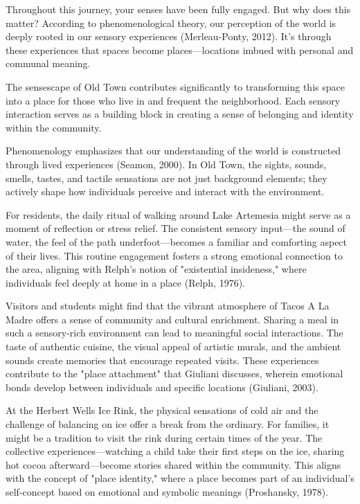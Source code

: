 \documentclass[12pt]{article}
\begin{document}
Throughout this journey, your senses have been fully engaged. But why does this matter? According to phenomenological theory, our perception of the world is deeply rooted in our sensory experiences (Merleau-Ponty, 2012). It's through these experiences that spaces become places—locations imbued with personal and communal meaning.

The sensescape of Old Town contributes significantly to transforming this space into a place for those who live in and frequent the neighborhood. Each sensory interaction serves as a building block in creating a sense of belonging and identity within the community.

Phenomenology emphasizes that our understanding of the world is constructed through lived experiences (Seamon, 2000). In Old Town, the sights, sounds, smells, tastes, and tactile sensations are not just background elements; they actively shape how individuals perceive and interact with the environment.

For residents, the daily ritual of walking around Lake Artemesia might serve as a moment of reflection or stress relief. The consistent sensory input—the sound of water, the feel of the path underfoot—becomes a familiar and comforting aspect of their lives. This routine engagement fosters a strong emotional connection to the area, aligning with Relph's notion of "existential insideness," where individuals feel deeply at home in a place (Relph, 1976).

Visitors and students might find that the vibrant atmosphere of Tacos A La Madre offers a sense of community and cultural enrichment. Sharing a meal in such a sensory-rich environment can lead to meaningful social interactions. The taste of authentic cuisine, the visual appeal of artistic murals, and the ambient sounds create memories that encourage repeated visits. These experiences contribute to the "place attachment" that Giuliani discusses, wherein emotional bonds develop between individuals and specific locations (Giuliani, 2003).

At the Herbert Wells Ice Rink, the physical sensations of cold air and the challenge of balancing on ice offer a break from the ordinary. For families, it might be a tradition to visit the rink during certain times of the year. The collective experiences—watching a child take their first steps on the ice, sharing hot cocoa afterward—become stories shared within the community. This aligns with the concept of "place identity," where a place becomes part of an individual's self-concept based on emotional and symbolic meanings (Proshansky, 1978).
\end{document}
